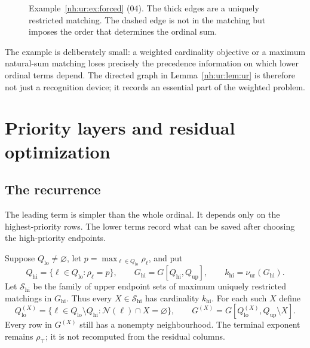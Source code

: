 \documentclass[11pt,a4paper]{article}
\theoremstyle{definition}
\theoremstyle{remark}
\newcommand{\Qlo}{Q_{\mathrm{lo}}}
\newcommand{\Qup}{Q_{\mathrm{up}}}
\newcommand{\Qhi}{Q_{\mathrm{hi}}}
\newcommand{\Nb}{\mathcal N}
\newcommand{\nuur}{\nu_{\mathrm{ur}}}
\newcommand{\rtop}{\rho_{\top}}
\begin{document}
\begin{figure}[htbp]
\centering
{}
\caption{Example~\ref{nh:ur:ex:forced} (04). The thick edges are a uniquely
restricted matching. The dashed edge is not in the matching but imposes the
order that determines the ordinal sum.}
\label{nh:ur:fig:forced}
\end{figure}

The example is deliberately small: a weighted cardinality objective or a
maximum natural-sum matching loses precisely the precedence information on
which lower ordinal terms depend. The directed graph in
Lemma~\ref{nh:ur:lem:ur} is therefore not just a recognition device; it
records an essential part of the weighted problem.

\section{Priority layers and residual optimization}\label{nh:ur:sec:layers}
\setcounter{equation}{0}

\subsection{The recurrence}
The leading term is simpler than the whole ordinal. It depends only on the
highest-priority rows. The lower terms record what can be saved after
choosing the high-priority endpoints.

Suppose $\Qlo\ne\varnothing$, let $p=\max_{\ell\in\Qlo}\rho_\ell$, and put
\[
 \Qhi=\{\ell\in\Qlo:\rho_\ell=p\},\qquad
 G_{\mathrm{hi}}=G[\Qhi,\Qup],\qquad k_{\mathrm{hi}}=\nuur(G_{\mathrm{hi}}).
\]
Let $\mathscr S_{\mathrm{hi}}$ be the family of upper endpoint sets of maximum
uniquely restricted matchings in $G_{\mathrm{hi}}$. Thus every
$X\in\mathscr S_{\mathrm{hi}}$ has cardinality $k_{\mathrm{hi}}$. For each
such $X$ define
\begin{equation}\label{nh:ur:eq:residual}
 \Qlo^{(X)}=\{\ell\in\Qlo\setminus\Qhi:\Nb(\ell)\cap X=\varnothing\},
 \qquad G^{(X)}=G[\Qlo^{(X)},\Qup\setminus X].
\end{equation}
Every row in $G^{(X)}$ still has a nonempty neighbourhood. The terminal
exponent remains $\rtop$; it is not recomputed from the residual columns.
\end{document}

